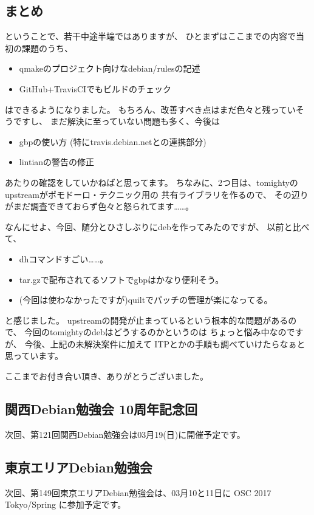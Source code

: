 \documentclass[mingoth,a4paper]{jsarticle}
\begin{document}
\subsection{まとめ}

ということで、若干中途半端ではありますが、
ひとまずはここまでの内容で当初の課題のうち、
\begin{itemize}
 \item qmakeのプロジェクト向けなdebian/rulesの記述
 \item GitHub+TravisCIでもビルドのチェック
\end{itemize}
はできるようになりました。
もちろん、改善すべき点はまだ色々と残っていそうですし、
まだ解決に至っていない問題も多く、今後は
\begin{itemize}
 \item gbpの使い方 (特にtravis.debian.netとの連携部分)
 \item lintianの警告の修正
\end{itemize}
あたりの確認をしていかねばと思ってます。
ちなみに、2つ目は、tomightyのupstreamがポモドーロ・テクニック用の
共有ライブラリを作るので、
その辺りがまだ調査できておらず色々と怒られてます……。

なんにせよ、今回、随分とひさしぶりにdebを作ってみたのですが、
以前と比べて、
\begin{itemize}
 \item dhコマンドすごい……。
 \item tar.gzで配布されてるソフトでgbpはかなり便利そう。
 \item (今回は使わなかったですが)quiltでパッチの管理が楽になってる。
\end{itemize}
と感じました。
upstreamの開発が止まっているという根本的な問題があるので、
今回のtomightyのdebはどうするのかというのは
ちょっと悩み中なのですが、
今後、上記の未解決案件に加えて
ITPとかの手順も調べていけたらなぁと思っています。

ここまでお付き合い頂き、ありがとうございました。



\subsection{関西Debian勉強会 10周年記念回}
次回、第121回関西Debian勉強会は03月19(日)に開催予定です。

\subsection{東京エリアDebian勉強会}
次回、第149回東京エリアDebian勉強会は、03月10と11日に OSC 2017 Tokyo/Spring に参加予定です。
\end{document}
